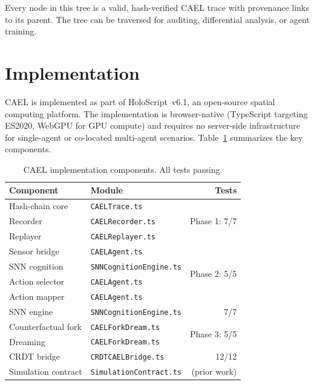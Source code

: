 \documentclass[sigconf,nonacm]{acmart}
\providecommand{\measuredFrom}[1]{}
\begin{document}
Every node in this tree is a valid, hash-verified CAEL trace
with provenance links to its parent. The tree can be traversed
for auditing, differential analysis, or agent training.


\section{Implementation}
\label{sec:implementation}

CAEL is implemented as part of HoloScript~v6.1, an open-source
spatial computing platform. The implementation is browser-native
(TypeScript targeting ES2020, WebGPU for GPU compute) and requires
no server-side infrastructure for single-agent or co-located
multi-agent scenarios. Table~\ref{tab:components} summarizes the
key components.

\begin{table}[t]
\caption{CAEL implementation components. All tests passing.}
\label{tab:components}
\small
\measuredFrom{HoloScript/packages/engine/src/simulation/__tests__/CAELPhase1.test.ts}%
\measuredFrom{HoloScript/packages/engine/src/simulation/__tests__/CAELPhase2Embodied.test.ts}%
\measuredFrom{HoloScript/packages/engine/src/simulation/__tests__/CAELPhase3ForkDream.test.ts}%
\measuredFrom{HoloScript/packages/engine/src/simulation/__tests__/CRDTCAELBridge.test.ts}%
\begin{tabular}{@{}llr@{}}
\toprule
\textbf{Component} & \textbf{Module} & \textbf{Tests} \\
\midrule
Hash-chain core & \texttt{CAELTrace.ts} & \multirow{3}{*}{Phase 1: 7/7} \\
  Recorder & \texttt{CAELRecorder.ts} & \\
  Replayer & \texttt{CAELReplayer.ts} & \\
\midrule
Sensor bridge & \texttt{CAELAgent.ts} & \multirow{4}{*}{Phase 2: 5/5} \\
  SNN cognition & \texttt{SNNCognitionEngine.ts} & \\
  Action selector & \texttt{CAELAgent.ts} & \\
  Action mapper & \texttt{CAELAgent.ts} & \\
\midrule
SNN engine & \texttt{SNNCognitionEngine.ts} & 7/7 \\
\midrule
Counterfactual fork & \texttt{CAELForkDream.ts} & \multirow{2}{*}{Phase 3: 5/5} \\
  Dreaming & \texttt{CAELForkDream.ts} & \\
\midrule
CRDT bridge & \texttt{CRDTCAELBridge.ts} & 12/12 \\
\midrule
Simulation contract & \texttt{SimulationContract.ts} & (prior work) \\
\bottomrule
\end{tabular}
\end{table}
\end{document}
